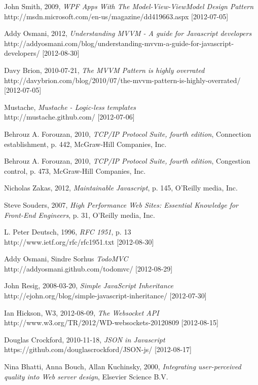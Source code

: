 \begin{thebibliography}{9}
 John Smith, 2009, {\em WPF Apps With The Model-View-ViewModel Design Pattern}\\http://msdn.microsoft.com/en-us/magazine/dd419663.aspx [2012-07-05]

 Addy Osmani, 2012, {\em Understanding MVVM - A guide for Javascript developers}\\http://addyosmani.com/blog/understanding-mvvm-a-guide-for-javascript-developers/ [2012-08-30]

 Davy Brion, 2010-07-21, {\em The MVVM Pattern is highly overrated}\\http://davybrion.com/blog/2010/07/the-mvvm-pattern-is-highly-overrated/ [2012-07-05]

 Mustache, {\em Mustache - Logic-less templates}\\http://mustache.github.com/ [2012-07-06]

 Behrouz A. Forouzan, 2010, {\em TCP/IP Protocol Suite, fourth edition}, Connection establishment, p. 442, McGraw-Hill Companies, Inc.

 Behrouz A. Forouzan, 2010, {\em TCP/IP Protocol Suite, fourth edition}, Congestion control, p. 473, McGraw-Hill Companies, Inc.

 Nicholas Zakas, 2012, {\em Maintainable Javascript}, p. 145, O'Reilly media, Inc.

 Steve Souders, 2007, {\em High Performance Web Sites: Essential Knowledge for Front-End Engineers}, p. 31, O'Reilly media, Inc.

 L. Peter Deutsch, 1996, {\em RFC 1951}, p. 13\\http://www.ietf.org/rfc/rfc1951.txt [2012-08-30]

 Addy Osmani, Sindre Sorhus {\em TodoMVC}\\http://addyosmani.github.com/todomvc/ [2012-08-29]

 John Resig, 2008-03-20, {\em Simple JavaScript Inheritance}\\http://ejohn.org/blog/simple-javascript-inheritance/ [2012-07-30]

 Ian Hickson, W3, 2012-08-09, {\em The Websocket API}\\http://www.w3.org/TR/2012/WD-websockets-20120809 [2012-08-15]

 Douglas Crockford, 2010-11-18, {\em JSON in Javascript}\\https://github.com/douglascrockford/JSON-js/ [2012-08-17]

 Nina Bhatti, Anna Bouch, Allan Kuchinsky, 2000, {\em Integrating user-perceived quality into Web server design}, Elsevier Science B.V.

\end{thebibliography}
